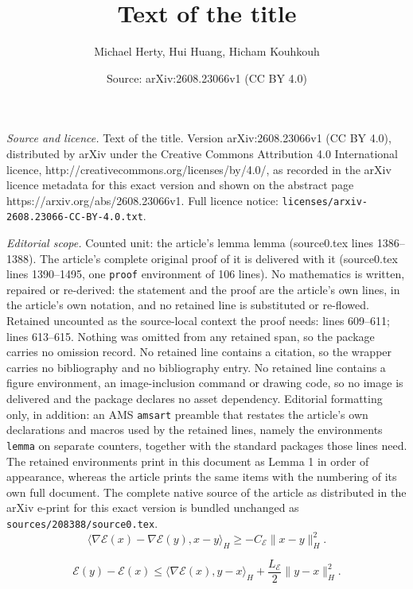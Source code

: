 \documentclass[10pt,a4paper]{amsart}
\title{Text of the title}
\author{Michael Herty, Hui Huang, Hicham Kouhkouh}
\date{Source: arXiv:2608.23066v1 (CC BY 4.0)}
\begin{document}
\maketitle

\noindent\emph{Source and licence.} Text of the title. Version arXiv:2608.23066v1 (CC BY 4.0), distributed by arXiv under the Creative Commons Attribution 4.0 International licence, http://creativecommons.org/licenses/by/4.0/, as recorded in the arXiv licence metadata for this exact version and shown on the abstract page https://arxiv.org/abs/2608.23066v1. Full licence notice: \texttt{licenses/arxiv-2608.23066-CC-BY-4.0.txt}.\par\smallskip

\noindent\textit{Editorial scope.} Counted unit: the article's lemma lemma (source0.tex lines 1386--1388). The article's complete original proof of it is delivered with it (source0.tex lines 1390--1495, one \texttt{proof} environment of 106 lines). No mathematics is written, repaired or re-derived: the statement and the proof are the article's own lines, in the article's own notation, and no retained line is substituted or re-flowed.  Retained uncounted as the source-local context the proof needs: lines 609--611; lines 613--615.  Nothing was omitted from any retained span, so the package carries no omission record.  No retained line contains a citation, so the wrapper carries no bibliography and no bibliography entry.  No retained line contains a figure environment, an image-inclusion command or drawing code, so no image is delivered and the package declares no asset dependency.  Editorial formatting only, in addition: an AMS \texttt{amsart} preamble that restates the article's own declarations and macros used by the retained lines, namely the environments \texttt{lemma} on separate counters, together with the standard packages those lines need.  The retained environments print in this document as Lemma 1 in order of appearance, whereas the article prints the same items with the numbering of its own full document.  The complete native source of the article as distributed in the arXiv e-print for this exact version is bundled unchanged as \texttt{sources/208388/source0.tex}.
        \begin{equation}\label{eq:osl_condition}
            \langle \nabla \mathscr{E}(x) - \nabla \mathscr{E}(y), x - y \rangle_H \ge -C_{\mathscr{E}} \|x - y\|_H^2.
        \end{equation}

        \begin{equation}\label{eq:quadratic_condition}
            \mathscr{E}(y) - \mathscr{E}(x) \le \langle \nabla \mathscr{E}(x), y - x \rangle_H + \frac{L_{\mathscr{E}}}{2} \|y - x\|_H^2.
        \end{equation}
\end{document}
